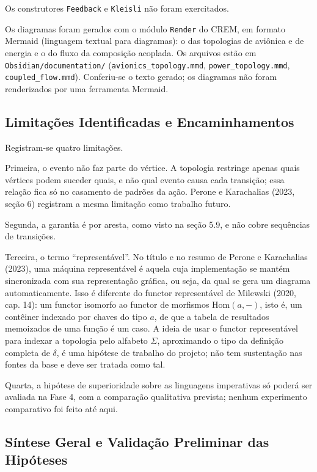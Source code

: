 \documentclass[12pt,a4paper]{article}
\begin{document}
Os construtores \texttt{Feedback} e \texttt{Kleisli} não foram exercitados.

Os diagramas foram gerados com o módulo \texttt{Render} do CREM, em formato Mermaid (linguagem textual para diagramas): o das topologias de aviônica e de energia e o do fluxo da composição acoplada. Os arquivos estão em \texttt{Obsidian/documentation/} (\texttt{avionics\_topology.mmd}, \texttt{power\_topology.mmd}, \texttt{coupled\_flow.mmd}). Conferiu-se o texto gerado; os diagramas não foram renderizados por uma ferramenta Mermaid.

\subsection{Limitações Identificadas e Encaminhamentos}

Registram-se quatro limitações.

Primeira, o evento não faz parte do vértice. A topologia restringe apenas quais vértices podem suceder quais, e não qual evento causa cada transição; essa relação fica só no casamento de padrões da ação. Perone e Karachalias (2023, seção 6) registram a mesma limitação como trabalho futuro.

Segunda, a garantia é por aresta, como visto na seção 5.9, e não cobre sequências de transições.

Terceira, o termo ``representável''. No título e no resumo de Perone e Karachalias (2023), uma máquina representável é aquela cuja implementação se mantém sincronizada com sua representação gráfica, ou seja, da qual se gera um diagrama automaticamente. Isso é diferente do functor representável de Milewski (2020, cap. 14): um functor isomorfo ao functor de morfismos $\mathrm{Hom}(a, -)$, isto é, um contêiner indexado por chaves do tipo $a$, de que a tabela de resultados memoizados de uma função é um caso. A ideia de usar o functor representável para indexar a topologia pelo alfabeto $\Sigma$, aproximando o tipo da definição completa de $\delta$, é uma hipótese de trabalho do projeto; não tem sustentação nas fontes da base e deve ser tratada como tal.

Quarta, a hipótese de superioridade sobre as linguagens imperativas só poderá ser avaliada na Fase 4, com a comparação qualitativa prevista; nenhum experimento comparativo foi feito até aqui.

\subsection{Síntese Geral e Validação Preliminar das Hipóteses}
\end{document}
